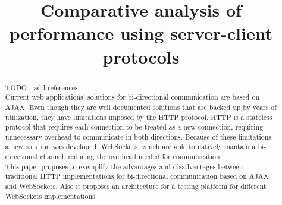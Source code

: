 \documentclass[conference]{IEEEtran}
\begin{document}
\title{Comparative analysis of performance using server-client protocols}

\author{
\and
{}
}

\maketitle

\begin{abstract}
TODO - add references
\\
\indent
Current web applications' solutions for bi-directional communication are based on AJAX.
Even though they are well documented solutions that are backed up by years of
utilization, they have limitations imposed by the HTTP protocol. HTTP is a
stateless protocol that requires each connection to be treated as a new
connection, requiring unnecessary overhead to communicate in both directions.
Because of these limitations a new solution was developed, WebSockets,
which are able to natively mantain a bi-directional channel, reducing the
overhead needed for communication.
\\
\indent
This paper proposes to exemplify the advantages and disadvantages between
traditional HTTP implementations for bi-directional communication based on AJAX
and WebSockets. Also it proposes an architecture for a testing platform for
different WebSockets implementations.
\end{abstract}

\IEEEpeerreviewmaketitle

\end{document}
